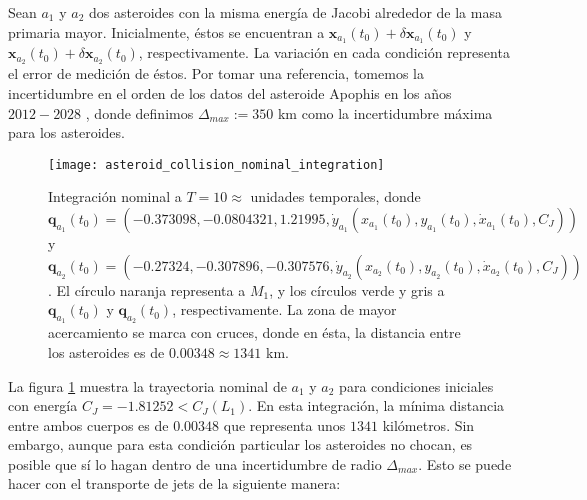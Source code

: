 
Sean $a_1$ y $a_2$ dos asteroides con la misma energía de Jacobi alrededor de la masa primaria mayor. Inicialmente, éstos se encuentran a $\mathbf{x}_{a_1}(t_0) + \delta\mathbf{x}_{a_1}(t_0)$  y $\mathbf{x}_{a_2}(t_0) + \delta\mathbf{x}_{a_2}(t_0)$, respectivamente. La variación en cada condición representa el error de medición de éstos. Por tomar una referencia, tomemos la incertidumbre en el orden de los datos del asteroide Apophis en los años $2012 - 2028$ \cite{Desmars2013}, donde definimos $\Delta_{max} := 350 $ km como la incertidumbre máxima para los asteroides.

\begin{figure}
 \centering
 \texttt{[image: asteroid\_collision\_nominal\_integration]}
 \caption{Integración nominal a $T=10 \approx $ unidades temporales, donde $\mathbf{q}_{a_1}(t_0) = \left( -0.373098, -0.0804321, 1.21995, \dot{y}_{a_1} \left( x_{a_1}(t_0), y_{a_1}(t_0), \dot{x}_{a_1}(t_0), C_J \right) \right)$ 
 y $\mathbf{q}_{a_2}(t_0) = \left( -0.27324, -0.307896, -0.307576, \dot{y}_{a_2} \left( x_{a_2}(t_0), y_{a_2}(t_0), \dot{x}_{a_2}(t_0), C_J \right) \right)$. El círculo naranja representa a $M_1$, y los círculos verde y gris a $\mathbf{q}_{a_1}(t_0)$ y $\mathbf{q}_{a_2}(t_0)$, respectivamente. La zona de mayor acercamiento se marca con cruces, donde en ésta, la distancia entre los asteroides es de $0.00348 \approx 1341$ km.}
 \label{fig:asteroid_collision_nominal_integration}
\end{figure}

La figura \ref{fig:asteroid_collision_nominal_integration} muestra la trayectoria nominal de $a_1$ y $a_2$ para condiciones iniciales con energía $C_J = -1.81252 < C_J(L_1)$. En esta integración, la mínima distancia entre ambos cuerpos es de $0.00348$ que representa unos $1341$ kilómetros. Sin embargo, aunque para esta condición particular los asteroides no chocan, es posible que sí lo hagan dentro de una incertidumbre de radio $\Delta_{max}$. Esto se puede hacer con el transporte de jets de la siguiente manera: 

